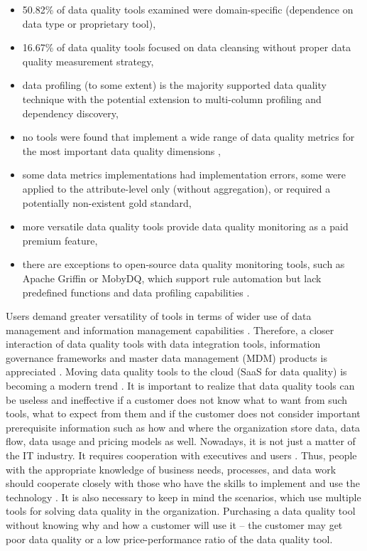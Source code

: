 		\begin{itemize}
			\item 50.82\% of data quality tools examined were domain-specific (dependence on data type or proprietary tool),
			\item 16.67\% of data quality tools focused on data cleansing without proper data quality measurement strategy,
			\item data profiling (to some extent) is the majority supported data quality technique with the potential extension to multi-column profiling and dependency discovery,
			\item no tools were found that implement a wide range of data quality metrics for the most important data quality dimensions ,
			\item some data metrics implementations had implementation errors, some were applied to the attribute-level only (without aggregation), or required a potentially non-existent gold standard,
			\item more versatile data quality tools provide data quality monitoring as a paid premium feature,
			\item there are exceptions to open-source data quality monitoring tools, such as Apache Griffin or MobyDQ, which support rule automation but lack predefined functions and data profiling capabilities \cite{Ehrlinger2019}.
		\end{itemize}		    	
    	
		Users demand greater versatility of tools in terms of wider use of data management and information management capabilities \cite{Chien2019}. Therefore, a closer interaction of data quality tools with data integration tools, information governance frameworks and master data management (MDM) products is appreciated \cite{Chien2019}. Moving data quality tools to the cloud (SaaS for data quality) is becoming a modern trend \cite{Chien2019}.    		
    	It is important to realize that data quality tools can be useless and ineffective if a customer does not know what to want from such tools, what to expect from them and if the customer does not consider important prerequisite information such as how and where the organization store data, data flow, data usage and pricing models as well. Nowadays, it is not just a matter of the IT industry. It requires cooperation with executives and users \cite{Chien2019}. Thus, people with the appropriate knowledge of business needs, processes, and data work should cooperate closely with those who have the skills to implement and use the technology \cite{McGilvray2008}. It is also necessary to keep in mind the scenarios, which use multiple tools for solving data quality in the organization. Purchasing a data quality tool without knowing why and how a customer will use it -- the customer may get poor data quality or a low price-performance ratio of the data quality tool.  	
    	
